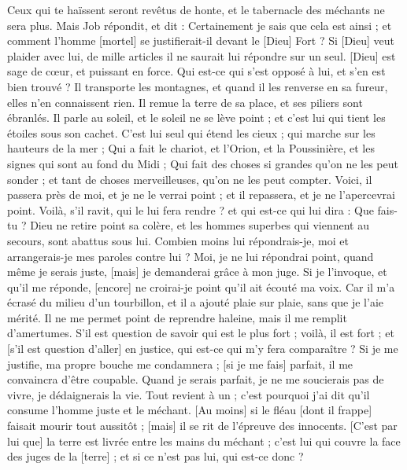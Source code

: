 \begin{multicols}{2}
Ceux qui te haïssent seront revêtus de honte, et le tabernacle des méchants ne sera plus.
\VerseOne{}Mais Job répondit, et dit :
Certainement je sais que cela est ainsi ; et comment l'homme [mortel] se justifierait-il devant le [Dieu] Fort ?
Si [Dieu] veut plaider avec lui, de mille articles il ne saurait lui répondre sur un seul.
[Dieu] est sage de cœur, et puissant en force. Qui est-ce qui s'est opposé à lui, et s'en est bien trouvé ?
Il transporte les montagnes, et quand il les renverse en sa fureur, elles n'en connaissent rien.
Il remue la terre de sa place, et ses piliers sont ébranlés.
Il parle au soleil, et le soleil ne se lève point ; et c'est lui qui tient les étoiles sous son cachet.
C'est lui seul qui étend les cieux ; qui marche sur les hauteurs de la mer ;
Qui a fait le chariot, et l'Orion, et la Poussinière, et les signes qui sont au fond du Midi ;
Qui fait des choses si grandes qu'on ne les peut sonder ; et tant de choses merveilleuses, qu'on ne les peut compter.
Voici, il passera près de moi, et je ne le verrai point ; et il repassera, et je ne l'apercevrai point.
Voilà, s'il ravit, qui le lui fera rendre ? et qui est-ce qui lui dira : Que fais-tu ?
Dieu ne retire point sa colère, et les hommes superbes qui viennent au secours, sont abattus sous lui.
Combien moins lui répondrais-je, moi et arrangerais-je mes paroles contre lui ?
Moi, je ne lui répondrai point, quand même je serais juste, [mais] je demanderai grâce à mon juge.
Si je l'invoque, et qu'il me réponde, [encore] ne croirai-je point qu'il ait écouté ma voix.
Car il m'a écrasé du milieu d'un tourbillon, et il a ajouté plaie sur plaie, sans que je l'aie mérité.
Il ne me permet point de reprendre haleine, mais il me remplit d'amertumes.
S'il est question de savoir qui est le plus fort ; voilà, il est fort ; et [s'il est question d'aller] en justice, qui est-ce qui m'y fera comparaître ?
Si je me justifie, ma propre bouche me condamnera ; [si je me fais] parfait, il me convaincra d'être coupable.
Quand je serais parfait, je ne me soucierais pas de vivre, je dédaignerais la vie.
Tout revient à un ; c'est pourquoi j'ai dit qu'il consume l'homme juste et le méchant.
[Au moins] si le fléau [dont il frappe] faisait mourir tout aussitôt ; [mais] il se rit de l'épreuve des innocents.
[C'est par lui que] la terre est livrée entre les mains du méchant ; c'est lui qui couvre la face des juges de la [terre] ; et si ce n'est pas lui, qui est-ce donc ?

\end{multicols}
